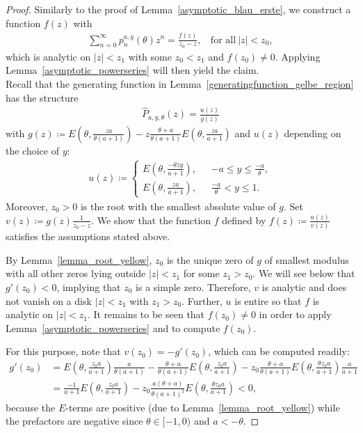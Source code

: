 \documentclass[10pt,a4paper]{amsart}
\newcommand{\E}{\mathbb{E}} %
\begin{document}
\begin{proof}
Similarly to the proof of Lemma~\ref{asymptotic_blau_erste}, we construct a function $f(z)$ with
    \begin{align}\label{gelb_f}
        \sum_{n=0}^{\infty}p_n^{a,y}(\theta)z^n=\frac{f(z)}{z_0-z},~~~~\text{for all}~|z|<z_0,
    \end{align}
   which is analytic on $|z|<z_1$ with some $z_0<z_1$ and $f\! \left(z_0\right)\neq 0$. Applying Lemma~\ref{asymptotic_powerseries} will then yield the claim.
\\Recall that the generating function in Lemma~\ref{generatingfunction_gelbe_region} has the structure 
\begin{align*}
    \hat{P}_{a,y,\theta}(z)=\frac{u(z)}{g(z)}
\end{align*}
with $g(z)\coloneqq E\left(\theta,\frac{za}{\theta(a+1)}\right)-z\frac{\theta +a}{\theta(a+1)}E\left(\theta,\frac{za}{a+1}\right)$ and $u(z)$ depending on the choice of $y$: 
\begin{align*}
    u(z)\coloneqq\begin{cases}
         E\left(\theta,\frac{-\theta zy}{a+1}\right),~~~&-a\leq y \leq \frac{-a}{\theta},
         \\E\left(\theta,\frac{za}{a+1}\right),~~&\frac{-a}{\theta}<y\leq1.
    \end{cases}
\end{align*}
Moreover, $z_0>0$ is the root with the smallest absolute value of $g$. Set $v(z)\coloneqq g(z)\frac{1}{z_0-z}$.
We show that the function $f$ defined by $f(z)\coloneqq\frac{u(z)}{v(z)}$ satisfies the assumptions stated above.

By Lemma~\ref{lemma_root_yellow}, $z_0$ is the unique zero of $g$ of smallest modulus with all other zeros lying outside $|z|<z_1$ for some $z_1>z_0$. We will see below that $g'(z_0)<0$, implying that $z_0$ is a simple zero. Therefore, $v$ is analytic and does not vanish on a disk $|z|<z_1$ with $z_1>z_0$. Further, $u$ is entire so that $f$ is analytic on $|z|<z_1$. It remains to be seen that $f(z_0)\neq 0$ in order to apply Lemma~\ref{asymptotic_powerseries} and to compute $f(z_0)$.

For this purpose, note that $v(z_0)=-g'(z_0)$, which can be computed readily:
\begin{align*}
    g'(z_0) & = E\left(\theta,\frac{z_0 a}{a+1}\right) \frac{a}{\theta(a+1)} - \frac{\theta +a}{\theta(a+1)}E\left(\theta,\frac{z_0 a}{a+1}\right) - z_0 \frac{\theta +a}{\theta(a+1)}E\left(\theta,\frac{\theta z_0a}{a+1}\right) \frac{a}{a+1} 
    \\
    & = \frac{-1}{a+1} E\left(\theta,\frac{z_0 a}{a+1}\right)  - z_0 \frac{a(\theta +a)}{\theta(a+1)^2}E\left(\theta,\frac{\theta z_0a}{a+1}\right) < 0,
\end{align*}
because the $E$-terms are positive (due to Lemma~\ref{lemma_root_yellow}) while the prefactors are negative since $\theta\in[-1,0)$ and $a<-\theta$.


\end{proof}
\end{document}

